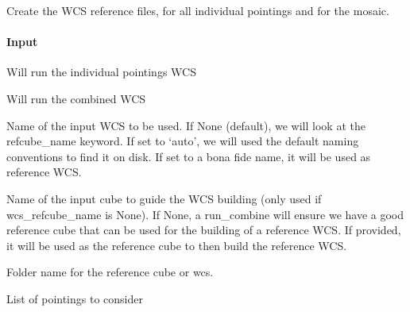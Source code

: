 \documentclass[letterpaper,10pt,english]{sphinxmanual}
\begin{document}
\begin{fulllineitems}
\begin{fulllineitems}
\label{\detokenize{api/pymusepipe:pymusepipe.combine.MusePointings.create_reference_wcs}}
\pysigstartsignatures
{}
\pysigstopsignatures
\sphinxAtStartPar
Create the WCS reference files, for all individual pointings and for
the mosaic.


\paragraph{Input}
\label{\detokenize{api/pymusepipe:id43}}\begin{description}
\sphinxAtStartPar
Will run the individual pointings WCS

\sphinxAtStartPar
Will run the combined WCS

\sphinxAtStartPar
Name of the input WCS to be used. If None (default), we will look at the refcube\_name keyword.
If set to ‘auto’, we will used the default naming conventions to find it on disk.
If set to a bona fide name, it will be used as reference WCS.

\sphinxAtStartPar
Name of the input cube to guide the WCS building (only used if wcs\_refcube\_name is None).
If None, a run\_combine will ensure we have a good reference cube that can be used for the building of a
reference WCS. If provided, it will be used as the reference cube to then build the reference WCS.

\sphinxAtStartPar
Folder name for the reference cube or wcs.

\sphinxAtStartPar
List of pointings to consider


\end{description}
\end{fulllineitems}
\end{fulllineitems}
\end{document}
